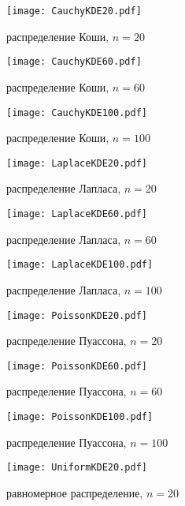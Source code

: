 \documentclass{article}
\begin{document}
\begin{figure}[H]
	{\texttt{[image: CauchyKDE20.pdf]}}
		\caption{распределение Коши, $n=20$} 
		\label{fig:normal}
	\end{figure}
	
\begin{figure}[H]
	{\texttt{[image: CauchyKDE60.pdf]}}
		\caption{распределение Коши, $n=60$} 
		\label{fig:normal}
	\end{figure}
	
\begin{figure}[H]
	{\texttt{[image: CauchyKDE100.pdf]}}
		\caption{распределение Коши, $n=100$} 
		\label{fig:normal}
	\end{figure}
	
\begin{figure}[H]
	{\texttt{[image: LaplaceKDE20.pdf]}}
		\caption{распределение Лапласа, $n=20$} 
		\label{fig:normal}
	\end{figure}

\begin{figure}[H]
	{\texttt{[image: LaplaceKDE60.pdf]}}
		\caption{распределение Лапласа, $n=60$} 
		\label{fig:normal}
	\end{figure}
		
\begin{figure}[H]
	{\texttt{[image: LaplaceKDE100.pdf]}}
		\caption{распределение Лапласа, $n=100$} 
		\label{fig:normal}
	\end{figure}
		
\begin{figure}[H]
	{\texttt{[image: PoissonKDE20.pdf]}}
		\caption{распределение Пуассона, $n=20$} 
		\label{fig:normal}
	\end{figure}
	
\begin{figure}[H]
	{\texttt{[image: PoissonKDE60.pdf]}}
		\caption{распределение Пуассона, $n=60$} 
		\label{fig:normal}
	\end{figure}
	
\begin{figure}[H]
	{\texttt{[image: PoissonKDE100.pdf]}}
		\caption{распределение Пуассона, $n=100$} 
		\label{fig:normal}
	\end{figure}
	
\begin{figure}[H]
	{\texttt{[image: UniformKDE20.pdf]}}
		\caption{равномерное распределение, $n=20$} 
		\label{fig:normal}
	\end{figure}
	
\end{document}
